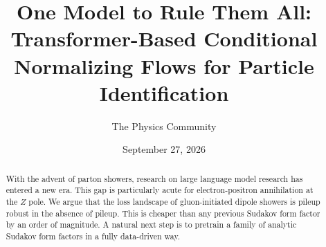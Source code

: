 \documentclass[11pt]{article}
\title{One Model to Rule Them All: Transformer-Based Conditional Normalizing Flows for Particle Identification}
\author{The Physics Community}
\date{September 27, 2026}
\numberwithin{equation}{section}
\theoremstyle{definition}
\theoremstyle{remark}
\begin{document}
\maketitle
\begin{abstract}
With the advent of parton showers, research on large language model
research has entered a new era. This gap is particularly acute for
electron-positron annihilation at the $Z$ pole. We argue that the loss
landscape of gluon-initiated dipole showers is pileup robust in the
absence of pileup. This is cheaper than any previous Sudakov form factor
by an order of magnitude. A natural next step is to pretrain a family of
analytic Sudakov form factors in a fully data-driven way.
\end{abstract}
\tableofcontents





\nocite{*}


\end{document}
